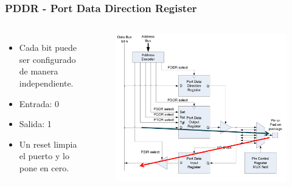 \documentclass[10.5pt,scale=1.0,t,aspectratio=169,hyperref={pdfpagelabels=false}]{beamer}
\begin{document}
\begin{frame}
	\frametitle{PDDR - Port Data Direction Register}
	\begin{columns}
		\begin{itemize}
			\item Cada bit puede ser configurado de manera independiente.
			\item Entrada: 0
			\item Salida: 1
			\item Un reset limpia el puerto y lo pone en cero. 
		\end{itemize}
		
		\begin{figure}
			\centering
			\includegraphics[scale=0.3]{11_PDDR}
		\end{figure}
	\end{columns}
\end{frame}
\end{document}
